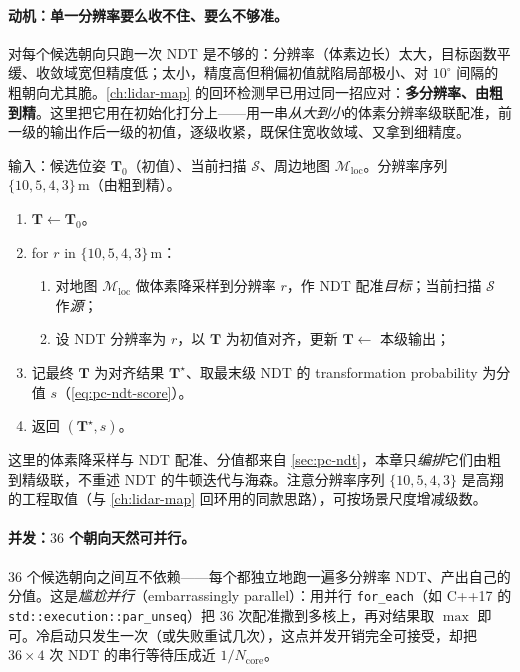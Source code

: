 \paragraph{动机：单一分辨率要么收不住、要么不够准。}
对每个候选朝向只跑一次 NDT 是不够的：分辨率（体素边长）太大，目标函数平缓、收敛域宽但精度低；太小，精度高但稍偏初值就陷局部极小、对 $10^\circ$ 间隔的粗朝向尤其脆。\cref{ch:lidar-map} 的回环检测早已用过同一招应对：\textbf{多分辨率、由粗到精}。这里把它用在初始化打分上——用一串\emph{从大到小}的体素分辨率级联配准，前一级的输出作后一级的初值，逐级收紧，既保住宽收敛域、又拿到细精度。

\begin{algo}\label{alg:lidar-loc-multi}
输入：候选位姿 $\mathbf T_0$（初值）、当前扫描 $\mathcal S$、周边地图 $\mathcal M_{\mathrm{loc}}$。分辨率序列 $\{10,5,4,3\}$\,m（由粗到精）。
\begin{enumerate}
  \item $\mathbf T\!\leftarrow\!\mathbf T_0$。
  \item for $r$ in $\{10,5,4,3\}$\,m：
  \begin{enumerate}
    \item 对地图 $\mathcal M_{\mathrm{loc}}$ 做体素降采样到分辨率 $r$，作 NDT 配准\emph{目标}；当前扫描 $\mathcal S$ 作\emph{源}；
    \item 设 NDT 分辨率为 $r$，以 $\mathbf T$ 为初值对齐，更新 $\mathbf T\!\leftarrow$ 本级输出；
  \end{enumerate}
  \item 记最终 $\mathbf T$ 为对齐结果 $\mathbf T^\star$、取最末级 NDT 的 transformation probability 为分值 $s$（\cref{eq:pc-ndt-score}）。
  \item 返回 $(\mathbf T^\star, s)$。
\end{enumerate}
\end{algo}

\noindent{}这里的体素降采样与 NDT 配准、分值都来自 \cref{sec:pc-ndt}，本章只\emph{编排}它们由粗到精级联，不重述 NDT 的牛顿迭代与海森。注意分辨率序列 $\{10,5,4,3\}$ 是高翔的工程取值（与 \cref{ch:lidar-map} 回环用的同款思路），可按场景尺度增减级数。

\paragraph{并发：$36$ 个朝向天然可并行。}
$36$ 个候选朝向之间互不依赖——每个都独立地跑一遍多分辨率 NDT、产出自己的分值。这是\emph{尴尬并行}（embarrassingly parallel）：用并行 \texttt{for\_each}（如 C++17 的 \texttt{std::execution::par\_unseq}）把 $36$ 次配准撒到多核上，再对结果取 $\max$ 即可。冷启动只发生一次（或失败重试几次），这点并发开销完全可接受，却把 $36\times4$ 次 NDT 的串行等待压成近 $1/N_{\mathrm{core}}$。

